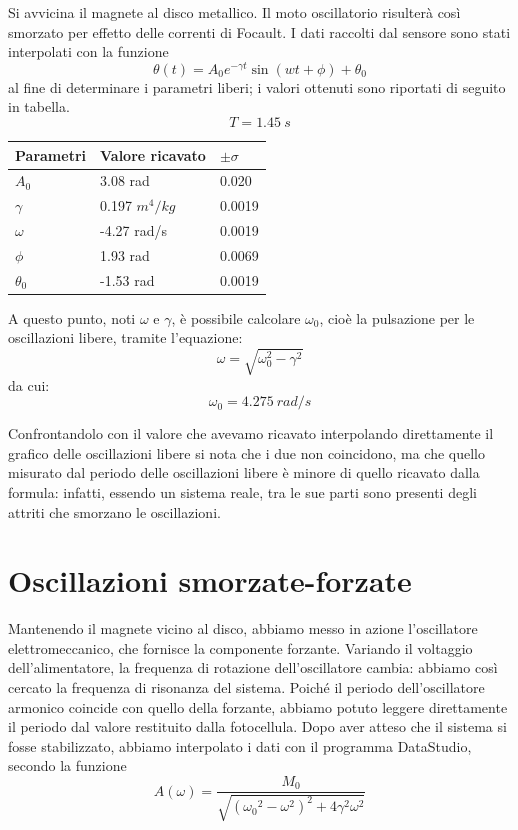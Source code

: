 Si avvicina il magnete al disco metallico. Il moto oscillatorio risulterà così smorzato per effetto delle correnti di Focault.
I dati raccolti dal sensore sono stati interpolati con la funzione
\begin{equation}\label{eq:theta}
\theta (t) = A_0 e^{- \gamma t} \sin(wt+\phi)+\theta_0
\end{equation}
al fine di determinare i parametri liberi; i valori ottenuti sono riportati di seguito in tabella.\\

$$T=1.45\ s$$

\begin{center}
\begin{tabular}{l|l|l}
Parametri & Valore ricavato & $ \pm \sigma$ \\
\midrule
$A_0$ & 3.08 rad & 0.020\\
$\gamma$ & 0.197 $m^4/kg$& 0.0019\\
$\omega$ & -4.27 rad/s& 0.0019\\
$\phi$ & 1.93 rad & 0.0069 \\
$\theta_0$ & -1.53 rad& 0.0019 \\
\end{tabular}
\end{center}

A questo punto, noti $\omega$ e $\gamma$, è possibile calcolare $ \omega_0 $, cioè la pulsazione per le oscillazioni libere, tramite l'equazione:
\begin{equation}\label{eq:omega}
\omega = \sqrt{\omega_0^2 - \gamma^2}
\end{equation} da cui:
$$\omega_0 = 4.275\ rad/s$$

Confrontandolo con il valore che avevamo ricavato interpolando direttamente il grafico delle oscillazioni libere si nota che i due non coincidono, ma che quello misurato dal periodo delle oscillazioni libere è minore di quello ricavato dalla formula: infatti, essendo un sistema reale, tra le sue parti sono presenti degli attriti che smorzano le oscillazioni.

\section{Oscillazioni smorzate-forzate}

Mantenendo il magnete vicino al disco, abbiamo messo in azione l'oscillatore elettromeccanico, che fornisce la componente forzante. Variando il voltaggio dell'alimentatore,  la frequenza di rotazione dell'oscillatore cambia: abbiamo così cercato la frequenza di risonanza del sistema.
Poiché il periodo dell'oscillatore armonico coincide con quello della forzante, abbiamo potuto leggere direttamente il periodo dal valore restituito dalla fotocellula. Dopo aver atteso che il sistema si fosse stabilizzato, abbiamo interpolato i dati con il programma DataStudio, secondo la funzione
\begin{equation} \label{A}
A(\omega) = \frac{M_0}{\sqrt{ ({\omega_0}^2-\omega^2)^2 + 4\gamma^2\omega^2}}
\end{equation}

